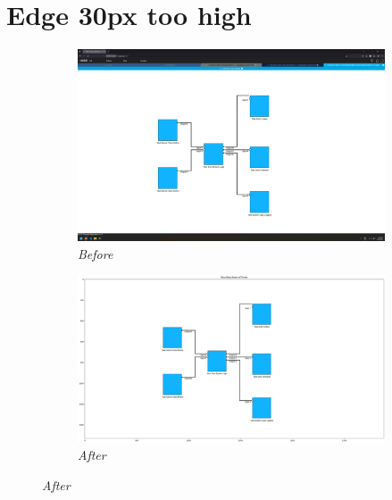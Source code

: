 \documentclass{article}
\begin{document}
\section{Edge 30px too high}
\begin{figure}[H]
    \centering
    \begin{subfigure}[t]{0.9\textwidth}
        \centering
        \includegraphics[width=\textwidth]{testcases/edge_30px_too_high/150756-999875_input_image.png}
        \caption*{\textit{Before}}
    \end{subfigure}
    \newline    
    \begin{subfigure}[t]{0.9\textwidth}
        \centering
        \includegraphics[width=\textwidth]{testcases/edge_30px_too_high/150809-647163_element_bbox_errors_labeled_colored.png}
        \caption*{\textit{After}}
    \end{subfigure}
    \label{fig:edge_too_high_30}
\end{figure}
\newpage
\end{document}
